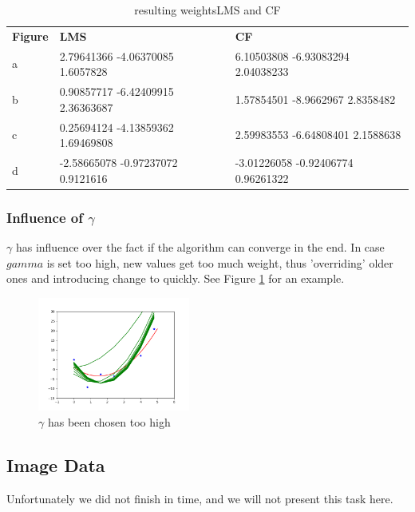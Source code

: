 \begin{table}[]
\begin{tabular}{lll}
\textbf{Figure} & \textbf{LMS} & \textbf{CF} \\
a               &        2.79641366 -4.06370085  1.6057828       &     6.10503808 -6.93083294  2.04038233       \\
b               &      0.90857717 -6.42409915  2.36363687        &     1.57854501 -8.9662967   2.8358482          \\
c               &        0.25694124 -4.13859362  1.69469808      &        2.59983553 -6.64808401  2.1588638         \\
d               &        -2.58665078 -0.97237072  0.9121616       &         -3.01226058 -0.92406774  0.96261322        \\
\end{tabular}
\caption{\label{tab:weights}resulting weights{LMS} and {CF}}
\end{table}


\subsubsection{Influence of $\gamma$ }
 $\gamma$ has influence over the fact if the algorithm can converge in the end. In case $gamma$ is set too high, new values get too much weight, thus 'overriding' older ones and introducing change to quickly. See Figure \ref {fig:gamma} for an example.

\begin{figure}[h]
\begin{center}
\centering
\includegraphics[width=5cm]{figures/fig_gamma.png}
\end{center}
\caption{\label{fig:gamma} $\gamma$ has been chosen too high }
\end{figure}


\newpage
\subsection{Image Data}
Unfortunately we did not finish in time, and we will not present this task here.

